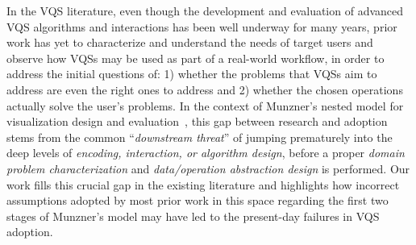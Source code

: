   \par In the VQS literature, even though the development and evaluation of advanced VQS algorithms and interactions has been well underway for many years, prior work has yet to characterize and understand the needs of target users and observe how VQSs may be used as part of a real-world workflow, in order to address the initial questions of: 1) whether the problems that VQSs aim to address are even the right ones to address and 2) whether the chosen operations actually solve the user's problems. In the context of Munzner's nested model for visualization design and evaluation~\cite{munzner2009nested}, this gap between research and adoption stems from the common ``\textit{downstream threat}'' of jumping prematurely into the deep levels of \textit{encoding, interaction, or algorithm design}, before a proper \textit{domain problem characterization} and \textit{data/operation abstraction design} is performed. Our work fills this crucial gap in the existing literature and highlights how incorrect assumptions adopted by most prior work in this space regarding the first two stages of Munzner's model may have led to the present-day failures in VQS adoption.
